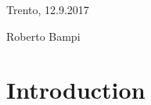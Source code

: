 \documentclass[english,12pt,a4paper,pdftex,sci,utf8]{aaltothesis}
\begin{document}
\makecoverpage


\keywords{}
\begin{abstractpage}[english]



\end{abstractpage}

\newpage
%

\vspace{5cm}
Trento, 12.9.2017

\vspace{5mm}
{\hfill Roberto Bampi \hspace{1cm}}

\newpage


\thesistableofcontents


\cleardoublepage
\storeinipagenumber
{}
\setcounter{page}{1}

\section{Introduction}
\label{section:intro}
\end{document}
